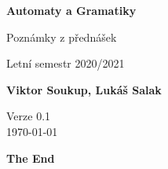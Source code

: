 \documentclass[11pt]{article}
\theoremstyle{nontheoremstyle}
\theoremstyle{nontheoremstylenodot}
\theoremstyle{theoremstyle}
\begin{document}
\begin{titlepage}
    \begin{center}
        \vspace*{1cm}
            
        \Huge
        \textbf{Automaty a Gramatiky}
            
        \vspace{0.5cm}
        \LARGE
        Poznámky z přednášek

        \vspace{5mm}
        
        Letní semestr 2020/2021
        
        \vspace{1.5cm}
            
        \textbf{Viktor Soukup, Lukáš Salak}
        
        \vfill
        \flushright
        \normalsize
        Verze 0.1\\
        \today
        
    \end{center}
\end{titlepage}

\tableofcontents
\clearpage












\vfill
\begin{center}
\LARGE
\textbf{The End}
\end{center}
\end{document}
